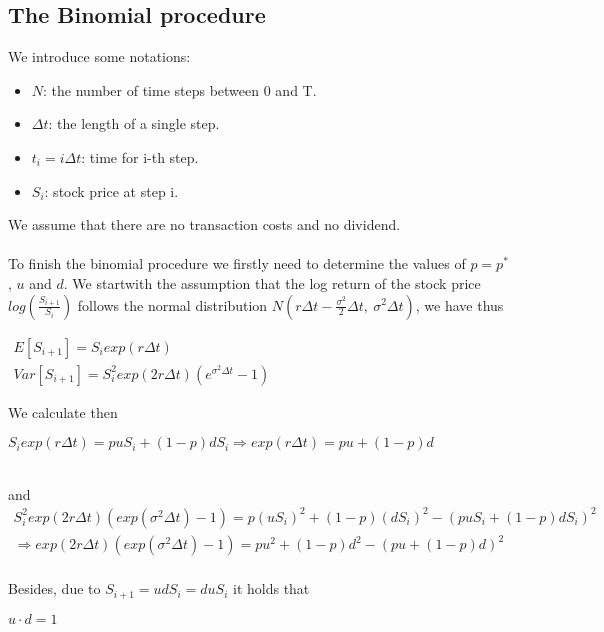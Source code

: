 \documentclass{article}
\begin{document}
\subsection{The Binomial procedure}
We introduce some notations:
\begin{itemize}
	\item $N$: the number of time steps between 0 and T.
	\item $\Delta t$: the length of a single step.
	\item $t_{i}=i\Delta t$: time for i-th step.
	\item $S_{i}$: stock price at step i.
\end{itemize}
We assume that there are no transaction costs and no dividend.
\\~\\
To finish the binomial procedure we firstly need to determine the values of $p=p^{*}$, $u$ and $d$. We startwith the assumption that the log return of the stock price $log\left( \frac{S_{i+1}}{S_{i}} \right)$ follows the normal distribution $N\left( r\Delta t-\frac{\sigma^{2} }{2} \Delta t,\  \sigma^{2} \Delta t\right)$, we have thus
\begin{center}
	$\begin{gathered}E\left[ S_{i+1}\right]  =S_{i}exp\left( r\Delta t\right)  \\ Var\left[ S_{i+1}\right]  =S^{2}_{i}exp\left( 2r\Delta t\right)  \left( e^{\sigma^{2} \Delta t}-1\right)  \end{gathered}$
\end{center}
We calculate then
\begin{center}
	$S_{i}exp\left( r\Delta t\right)  =puS_{i}+\left( 1-p\right)  dS_{i}\Longrightarrow exp\left( r\Delta t\right)  =pu+\left( 1-p\right)  d$
\end{center}~\\
and
~\\

$\begin{gathered}S^{2}_{i}exp\left( 2r\Delta t\right)  \left( exp\left( \sigma^{2} \Delta t\right)  -1\right)  =p\left( uS_{i}\right)^{2}  +\left( 1-p\right)  \left( dS_{i}\right)^{2}  -\left( puS_{i}+\left( 1-p\right)  dS_{i}\right)^{2}  \\ \Longrightarrow exp\left( 2r\Delta t\right)  \left( exp\left( \sigma^{2} \Delta t\right)  -1\right)  =pu^{2}+\left( 1-p\right)  d^{2}-\left( pu+\left( 1-p\right)  d\right)^{2}  \end{gathered} $
\\~\\
Besides, due to $S_{i+1}=udS_{i}=duS_{i}$ it holds that
\begin{center}
	$u\cdot d=1$
\end{center}
\end{document}
